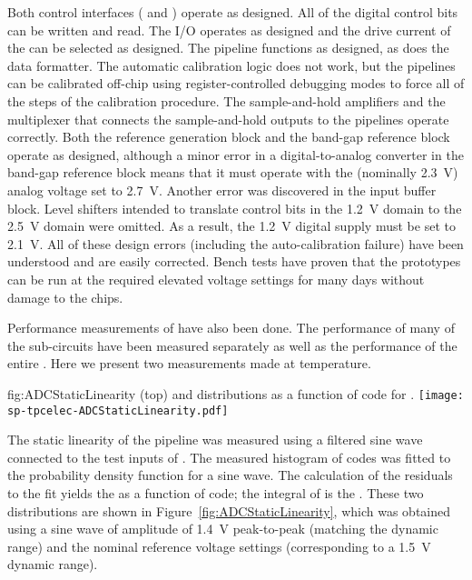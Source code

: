 Both control interfaces ( and ) operate as designed. All of the digital control
bits can be written and read. The  I/O operates as designed and the drive current of the
 can be selected as designed. The  pipeline functions as
designed, as does the data formatter. The automatic calibration logic does not work, but the pipelines 
can be calibrated off-chip using register-controlled debugging modes to force all of the steps of the 
calibration procedure. The sample-and-hold amplifiers and the multiplexer that connects the sample-and-hold 
outputs to the  pipelines operate correctly. Both the  reference generation 
block and the band-gap reference block operate as designed, although a minor error in
a digital-to-analog converter in the band-gap reference block means that it must operate with the 
(nominally \SI{2.3}{V}) analog voltage set to \SI{2.7}{V}. Another error was discovered in the input 
buffer block. Level shifters intended to translate control bits in the \SI{1.2}{V} domain to the 
\SI{2.5}{V} domain were omitted. As a result, the \SI{1.2}{V} digital supply must be set to 
\SI{2.1}{V}. All of these design errors (including the auto-calibration failure) have been understood
and are easily corrected. Bench tests have proven that the  prototypes can be run at the 
required elevated voltage settings for many days without damage to the chips.

Performance measurements of  have also been done. The performance of many of 
the sub-circuits have been measured separately as well as the performance of the entire .  
Here we present two measurements made at \lntwo temperature.

\begin{dunefigure}
{fig:ADCStaticLinearity}
{ (top) and  distributions as a function of  code for .}
\texttt{[image: sp-tpcelec-ADCStaticLinearity.pdf]}
\end{dunefigure}

The static linearity of the pipeline  was measured using a filtered sine wave connected to
the test inputs of . The measured histogram of  codes was fitted to the 
probability density function for a sine wave. The calculation of the residuals to the fit yields the  
as a function of  code; the integral of  is the . These two
distributions are shown in Figure~\ref{fig:ADCStaticLinearity}, which was obtained using a sine 
wave of amplitude of \SI{1.4}{V} peak-to-peak (matching the  dynamic range) and 
the nominal reference voltage settings (corresponding to a \SI{1.5}{V} dynamic range).

